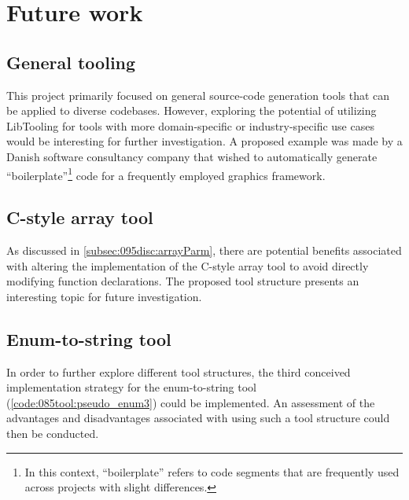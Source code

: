 \section{Future work}

\subsection*{General tooling}
This project primarily focused on general source-code generation tools that can be applied to diverse codebases.
However, exploring the potential of utilizing LibTooling for tools with more domain-specific or industry-specific use cases would be interesting for further investigation.
A proposed example was made by a Danish software consultancy company that wished to automatically generate ``boilerplate''\footnote{
    In this context, ``boilerplate'' refers to code segments that are frequently used across projects with slight differences.
} code for a frequently employed graphics framework.


\subsection*{C-style array tool}
As discussed in \cref{subsec:095disc:arrayParm}, there are potential benefits associated with altering the implementation of the C-style array tool to avoid directly modifying function declarations.
The proposed tool structure presents an interesting topic for future investigation.

\subsection*{Enum-to-string tool}
In order to further explore different tool structures, the third conceived implementation strategy for the enum-to-string tool (\cref{code:085tool:pseudo_enum3}) could be implemented.
An assessment of the advantages and disadvantages associated with using such a tool structure could then be conducted.

